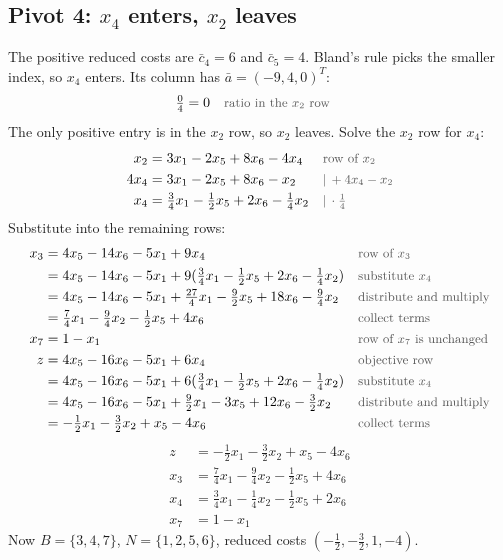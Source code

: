 \documentclass[a4paper,11pt]{article}
\newif\ifexplain
\newcommand{\teil}[1]{\subsection*{#1}}
\newcommand{\why}[1]{\text{\small\color{black!65}#1}}
\newcommand{\explain}[1]{\ifexplain\begin{erklbox}#1\end{erklbox}\fi}
\begin{document}
\explain{Beide Quotienten sind null. Deshalb entscheidet der Index der austretenden Basisvariablen: $x_1$ kommt vor $x_2$. Ein kleinerer Koeffizient wäre hier kein Entscheidungskriterium.}

\teil{Pivot 4: $x_4$ enters, $x_2$ leaves}
The positive reduced costs are $\bar c_4=6$ and $\bar c_5=4$. Bland's rule picks the smaller index, so $x_4$ enters. Its column has $\bar a = (-9,4,0)^T$:
\begin{align*}
\tfrac{0}{4} &= 0 && \why{ratio in the $x_2$ row}
\end{align*}
The only positive entry is in the $x_2$ row, so $x_2$ leaves. Solve the $x_2$ row for $x_4$:
\begin{align*}
x_2 &= 3x_1 - 2x_5 + 8x_6 - 4x_4 && \why{row of $x_2$}\\
4x_4 &= 3x_1 - 2x_5 + 8x_6 - x_2 && \why{$|\,+4x_4 - x_2$}\\
x_4 &= \tfrac34 x_1 - \tfrac12 x_5 + 2x_6 - \tfrac14 x_2 && \why{$|\,\cdot \tfrac14$}
\end{align*}
Substitute into the remaining rows:
\begin{align*}
x_3 &= 4x_5 - 14x_6 - 5x_1 + 9x_4 && \why{row of $x_3$}\\
&= 4x_5 - 14x_6 - 5x_1 + 9(\tfrac34 x_1 - \tfrac12 x_5 + 2x_6 - \tfrac14 x_2) && \why{substitute $x_4$}\\
&=4x_5-14x_6-5x_1+\tfrac{27}{4}x_1-\tfrac92x_5+18x_6-\tfrac94x_2 && \why{distribute and multiply}\\
&= \tfrac74 x_1 - \tfrac94 x_2 - \tfrac12 x_5 + 4x_6 && \why{collect terms}\\
x_7 &= 1 - x_1 && \why{row of $x_7$ is unchanged}\\
z &= 4x_5 - 16x_6 - 5x_1 + 6x_4 && \why{objective row}\\
&= 4x_5 - 16x_6 - 5x_1 + 6(\tfrac34 x_1 - \tfrac12 x_5 + 2x_6 - \tfrac14 x_2) && \why{substitute $x_4$}\\
&=4x_5-16x_6-5x_1+\tfrac92x_1-3x_5+12x_6-\tfrac32x_2 && \why{distribute and multiply}\\
&= -\tfrac12 x_1 - \tfrac32 x_2 + x_5 - 4x_6 && \why{collect terms}
\end{align*}
\[
\begin{aligned}
z &= -\tfrac12 x_1 - \tfrac32 x_2 + x_5 - 4x_6\\
x_3 &= \tfrac74 x_1 - \tfrac94 x_2 - \tfrac12 x_5 + 4x_6\\
x_4 &= \tfrac34 x_1 - \tfrac14 x_2 - \tfrac12 x_5 + 2x_6\\
x_7 &= 1 - x_1
\end{aligned}
\]
Now $B=\{3,4,7\}$, $N=\{1,2,5,6\}$, reduced costs $(-\tfrac12,-\tfrac32,1,-4)$.
\explain{Noch ein degenerierter Schritt: Die Schrittweite ist wieder $0$. Der Quotient $0$ in der $x_2$-Zeile zeigt, dass die austretende Variable $x_2$ bereits $0$ ist.}
\end{document}
